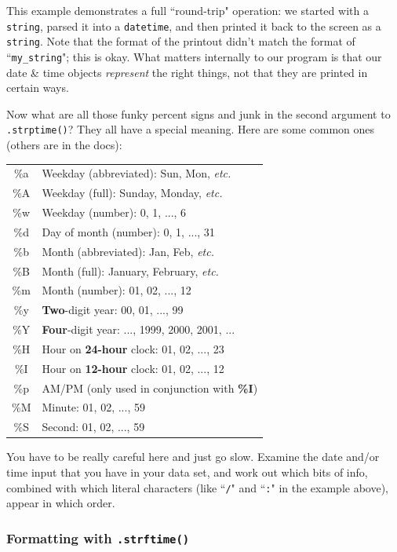 \documentclass[12pt]{article}
\begin{document}
This example demonstrates a full ``round-trip" operation: we started with a
\texttt{string}, parsed it into a \texttt{datetime}, and then printed it back
to the screen as a \texttt{string}. Note that the format of the printout
didn't match the format of ``\texttt{my\_string}"; this is okay. What matters
internally to our program is that our date \& time objects \textit{represent}
the right things, not that they are printed in certain ways.

Now what are all those funky percent signs and junk in the second argument to
\texttt{.strptime()}? They all have a special meaning. Here are some common
ones (others are in the docs):

\begin{center}
\begin{tabular}{|c|l|}
\hline
\%a & Weekday (abbreviated): Sun, Mon, \textit{etc.} \\
\%A & Weekday (full): Sunday, Monday, \textit{etc.} \\
\%w & Weekday (number): 0, 1, ..., 6 \\
\%d & Day of month (number): 0, 1, ..., 31 \\
\%b & Month (abbreviated): Jan, Feb, \textit{etc.} \\
\%B & Month (full): January, February, \textit{etc.} \\
\%m & Month (number): 01, 02, ..., 12 \\
\%y & \textbf{Two}-digit year: 00, 01, ..., 99 \\
\%Y & \textbf{Four}-digit year: ..., 1999, 2000, 2001, ...\\
\hline
\%H & Hour on \textbf{24-hour} clock: 01, 02, ..., 23 \\
\%I & Hour on \textbf{12-hour} clock: 01, 02, ..., 12 \\
\%p & AM/PM (only used in conjunction with \textbf{\%I}) \\
\%M & Minute: 01, 02, ..., 59 \\
\%S & Second: 01, 02, ..., 59 \\
\hline
\end{tabular}
\end{center}

You have to be really careful here and just go slow. Examine the date and/or
time input that you have in your data set, and work out which bits of info,
combined with which literal characters (like ``\texttt{/}" and ``\texttt{:}"
in the example above), appear in which order.

\subsubsection{Formatting with \texttt{.strftime()}}
\end{document}
